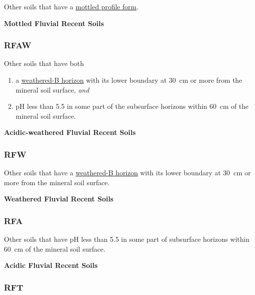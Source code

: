 \documentclass[
  letterpaper,
  DIV=11,
  numbers=noendperiod]{scrreprt}
\providecommand{\tightlist}{%
  \setlength{\itemsep}{0pt}\setlength{\parskip}{0pt}}\usepackage{longtable,booktabs,array}
\begin{document}
Other soils that have a \protect\hyperlink{sec-diag-mottpf}{mottled
profile form}.

\textbf{Mottled Fluvial Recent Soils}

\hypertarget{sec-key-RFAW}{%
\subsubsection{\texorpdfstring{\textbf{RFAW}}{RFAW}}\label{sec-key-RFAW}}

Other soils that have both

\begin{enumerate}
\def\labelenumi{\arabic{enumi}.}
\tightlist
\item
  a \protect\hyperlink{sec-diag-bw}{weathered-B horizon} with its lower
  boundary at 30~cm or more from the mineral soil surface, \emph{and}
\item
  pH less than 5.5 in some part of the subsurface horizons within 60~cm
  of the mineral soil surface.
\end{enumerate}

\textbf{Acidic-weathered Fluvial Recent Soils}

\hypertarget{sec-key-RFW}{%
\subsubsection{\texorpdfstring{\textbf{RFW}}{RFW}}\label{sec-key-RFW}}

Other soils that have a \protect\hyperlink{sec-diag-bw}{weathered-B
horizon} with its lower boundary at 30~cm or more from the mineral soil
surface.

\textbf{Weathered Fluvial Recent Soils}

\hypertarget{sec-key-RFA}{%
\subsubsection{\texorpdfstring{\textbf{RFA}}{RFA}}\label{sec-key-RFA}}

Other soils that have pH less than 5.5 in some part of subsurface
horizons within 60~cm of the mineral soil surface.

\textbf{Acidic Fluvial Recent Soils}

\hypertarget{sec-key-RFT}{%
\subsubsection{\texorpdfstring{\textbf{RFT}}{RFT}}\label{sec-key-RFT}}
\end{document}

